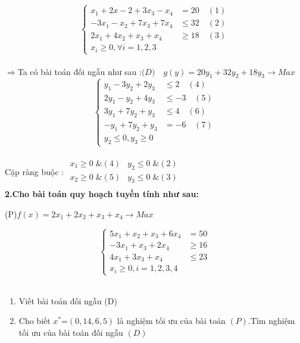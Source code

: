 \documentclass{article}
\begin{document}
    \[\left\{\begin{aligned}
        x_1+2x-2+3x_3-x_4&=20 \quad(1)\\
        -3x_1-x_2+7x_3+7x_4&\leq 32 \quad(2)\\
        2x_1+4x_2+x_3+x_4&\geq 18 \quad(3)\\
        x_i\geq 0,\forall i=1,2,3
    \end{aligned}\right.\]\\
    $\Longrightarrow$Ta có bài toán đối ngẫu như sau :$ \big(D\big)\quad g(y)=20y_1+32y_2+18y_3 \longrightarrow Max$ \\
    \[\left\{\begin{aligned}
         y_1-3y_2+2y_3&\leq 2 \quad(4)\\
        2y_1-y_2+4y_3&\leq-3 \quad(5)\\
        3y_1+7y_2+y_3&\leq 4 \quad(6)\\
        -y_1+7y_2+y_3&=-6 \quad(7)\\
        y_2\leq 0,y_3\geq 0
    \end{aligned}\right.\]\\
    Cặp ràng buộc : $\begin{array}{cr} 
        x_1\geq 0\; \&(4) &y_2\leq 0\; \&(2)\\
        x_2\geq 0\; \&(5) &y_3\leq 0\; \&(3)\\
    \end{array}$\\
    \textbf{2.Cho bài toán quy hoạch tuyến tính như sau:}\\
    \begin{center}
        \big(P\big)\quad $f(x)=2x_1+2x_2+x_3+x_4 \longrightarrow Max$\\
        \end{center}
    \[\left\{\begin{aligned}
        5x_1+x_2+x_3+6x_4&=50 \\
        -3x_1+x_3+2x_4&\geq16 \\
        4x_1+3x_3+x_4&\leq23 \\
        x_i\geq 0,i=1,2,3,4 
    \end{aligned}\right.\]\\
    \begin{enumerate}
        \item Viết bài toán đối ngẫu \big(D\big)
        \item Cho biết $x^*$=$\left(0,14,6,5\right)$ là nghiệm tối ưu của bài toán $\left(P\right)$.Tìm nghiệm tối ưu của bài toán đối ngẫu $\left(D\right)$
    \end{enumerate}
\end{document}
